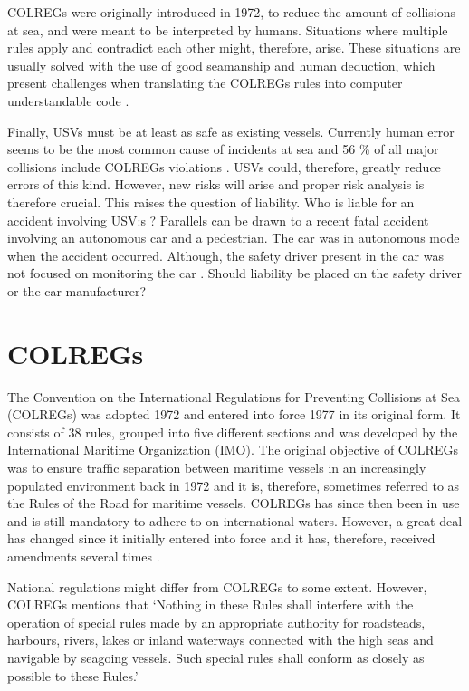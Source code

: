 COLREGs were originally introduced in 1972, to reduce the amount of collisions at sea, and were meant to be interpreted by humans. Situations where multiple rules apply and contradict each other might, therefore, arise. These situations are usually solved with the use of good seamanship and human deduction, which present challenges when translating the COLREGs rules into computer understandable code \cite{benjamin2006method}.

Finally, USVs must be at least as safe as existing vessels. Currently human error  seems to be the most common cause of incidents at sea \cite{chauvin2011human,roberts2014fatal,uugurlu2015analysis} and 56 \% of all major collisions include COLREGs violations \cite{statheros2008autonomous}. USVs could, therefore, greatly reduce errors of this kind. However, new risks will arise and proper risk analysis is therefore crucial. This raises the question of liability. Who is liable for an accident involving USV:s \cite{jokioinen2016remote}? Parallels can be drawn to a recent fatal accident involving an autonomous car and a pedestrian. The car was in autonomous mode when the accident occurred. Although, the safety driver present in the car was not focused on monitoring the car \cite{uber_accident_liab}. Should liability be placed on the safety driver or the car manufacturer?

\chapter{COLREGs}
\label{sec_colreg}
The Convention on the International Regulations for Preventing Collisions at Sea (COLREGs) was adopted 1972 and entered into force 1977 in its original form. It consists of 38 rules, grouped into five different sections and was developed by the International Maritime Organization (IMO).
The original objective of COLREGs was to ensure traffic separation between maritime vessels in an increasingly populated environment back in 1972 and it is, therefore, sometimes referred to as the Rules of the Road for maritime vessels. COLREGs has since then been in use and is still mandatory to adhere to on international waters. However, a great deal has changed since it initially entered into force and it has, therefore, received amendments several times \cite{colreg_about_imo}.

National regulations might differ from COLREGs to some extent. However, COLREGs mentions that ‘Nothing in these Rules shall interfere with the operation of special rules made by an appropriate authority for roadsteads, harbours, rivers, lakes or inland waterways connected with the high seas and navigable by seagoing vessels.
Such special rules shall conform as closely as possible to these Rules.’ \cite{colreg}

